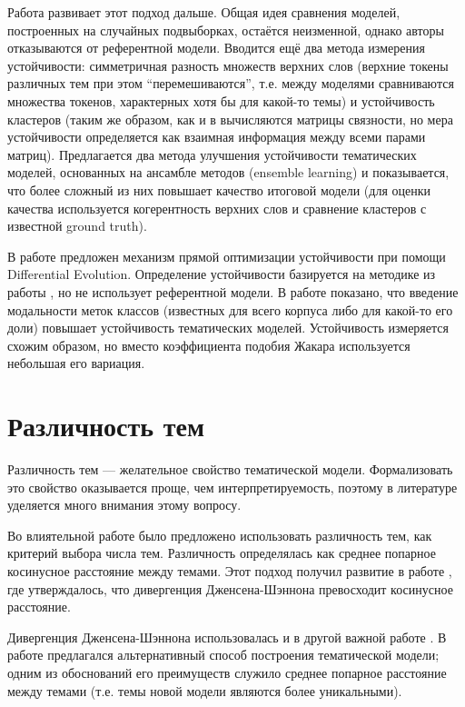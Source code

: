Работа \cite{belford2018stability} развивает этот подход дальше. Общая идея сравнения моделей, построенных на случайных подвыборках, остаётся неизменной, однако авторы отказываются от референтной модели. Вводится ещё два метода измерения устойчивости: симметричная разность множеств верхних слов (верхние токены различных тем при этом ``перемешиваются'', т.е. между моделями сравниваются множества токенов, характерных хотя бы для какой-то темы) и устойчивость кластеров (таким же образом, как и в \cite{Brunet4164} вычисляются матрицы связности, но мера устойчивости определяется как взаимная информация между всеми парами матриц). Предлагается два метода улучшения устойчивости тематических моделей, основанных на ансамбле методов (ensemble learning) и показывается, что более сложный из них повышает качество итоговой модели (для оценки качества используется когерентность верхних слов и сравнение кластеров с известной ground truth).

В работе \cite{agrawal2018wrong} предложен механизм прямой оптимизации устойчивости при помощи Differential Evolution. Определение устойчивости базируется на методике из работы \cite{greene14howmany}, но не использует референтной модели. В работе \cite{derbanosov} показано, что введение модальности меток классов (известных для всего корпуса либо для какой-то его доли) повышает устойчивость тематических моделей. Устойчивость измеряется схожим образом, но вместо коэффициента подобия Жакара используется небольшая его вариация.


\section{Различность тем}

Различность тем --- желательное свойство тематической модели. Формализовать это свойство оказывается проще, чем интерпретируемость, поэтому в литературе уделяется много внимания этому вопросу.

Во влиятельной работе \cite{cao2009density} было предложено использовать различность тем, как критерий выбора числа тем. Различность определялась как среднее попарное косинусное расстояние между темами. Этот подход получил развитие в работе \cite{deveaud2014accurate}, где утверждалось, что дивергенция Дженсена-Шэннона превосходит косинусное расстояние.

Дивергенция Дженсена-Шэннона использовалась и в другой важной работе \cite{Mimno}. В работе  предлагался альтернативный способ построения тематической модели; одним из обоснований его преимуществ служило среднее попарное расстояние между темами (т.е. темы новой модели являются более уникальными).

